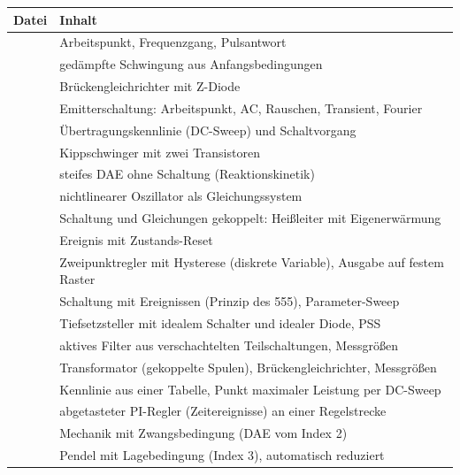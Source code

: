 \begin{longtable}{@{}P{5.5cm}P{8.5cm}@{}}
  \toprule
  Datei & Inhalt \\
  \midrule
  \endhead
  \bottomrule
  \endfoot
   & Arbeitspunkt, Frequenzgang, Pulsantwort \\
   & gedämpfte Schwingung aus Anfangsbedingungen \\
   & Brückengleichrichter mit Z-Diode \\
   & Emitterschaltung: Arbeitspunkt, AC, Rauschen, Transient, Fourier \\
   & Übertragungskennlinie (DC-Sweep) und Schaltvorgang \\
   & Kippschwinger mit zwei Transistoren \\
   & steifes DAE ohne Schaltung (Reaktionskinetik) \\
   & nichtlinearer Oszillator als Gleichungssystem \\
   & Schaltung und Gleichungen gekoppelt: Heißleiter mit Eigenerwärmung \\
   & Ereignis mit Zustands-Reset \\
   & Zweipunktregler mit Hysterese (diskrete Variable), Ausgabe auf festem Raster \\
   & Schaltung mit Ereignissen (Prinzip des 555), Parameter-Sweep \\
   & Tiefsetzsteller mit idealem Schalter und idealer Diode, PSS \\
   & aktives Filter aus verschachtelten Teilschaltungen, Messgrößen \\
   & Transformator (gekoppelte Spulen), Brückengleichrichter, Messgrößen \\
   & Kennlinie aus einer Tabelle, Punkt maximaler Leistung per DC-Sweep \\
   & abgetasteter PI-Regler (Zeitereignisse) an einer Regelstrecke \\
   & Mechanik mit Zwangsbedingung (DAE vom Index 2) \\
   & Pendel mit Lagebedingung (Index 3), automatisch reduziert \\

\end{longtable}
